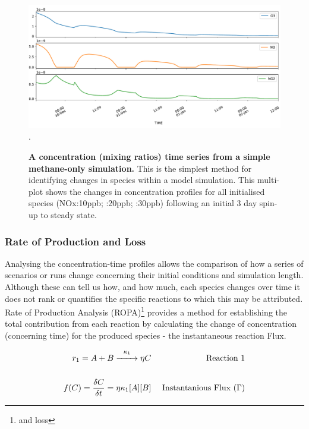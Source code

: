 \begin{figure}[H]
     \centering
         \includegraphics[width=.85\textwidth]{figures/ch2concentration.pdf}\\
         .
        \caption{\textbf{A concentration (mixing ratios) time series from a simple methane-only simulation.} This is the simplest method for identifying changes in species within a model simulation. This multi-plot shows the changes in concentration profiles for all initialised species (NOx:10ppb; :20ppb; :30ppb) following an initial 3 day spin-up to steady state. }
        \label{fig:concentration}
\end{figure}

\subsubsection{Rate of Production and Loss}

Analysing the concentration-time profiles allows the comparison of how a series of scenarios or runs change concerning their initial conditions and simulation length. Although these can tell us how, and how much, each species changes over time it does not rank or quantifies the specific reactions to which this may be attributed. Rate of Production Analysis (ROPA)\footnote{and loss} provides a method for establishing the total contribution from each reaction by calculating the change of concentration (concerning time) for the produced species - the instantaneous reaction Flux.

\begin{eqnarray}
  r_1 = A + B \overset{\kappa_1}{\xrightarrow{\hspace*{7mm}}} \eta C & & \text{ Reaction 1}\\[15pt]
  f(C) = \dfrac{\delta C}{\delta t} =  \eta  \kappa_1 [A][B]                     & & \text{ Instantanious Flux }(\Gamma) \label{eqn:ode}
\end{eqnarray}

